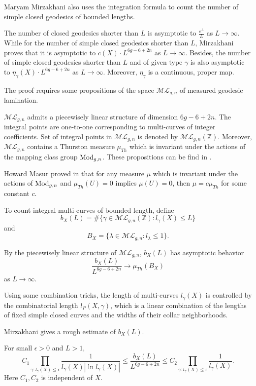 Maryam Mirzakhani also uses the integration formula to count the number of simple closed geodesics of bounded lengths. 

The number of closed geodesics shorter than $L$  is asymptotic to $\frac{e^L}{L}$ as $L\to \infty$. 
While for the number of  simple closed geodesics shorter than $L$,  Mirzakhani proves that it is asymptotic to $c(X)\cdot L^{6g-6+2n}$ as $L\to\infty$. Besides, the number of simple closed geodesics shorter than $L$ and of given  type $\gamma$ is also asymptotic to $\eta_{\gamma}(X)\cdot L^{6g-6+2n}$ as $L\to \infty$. Moreover, $\eta_{\gamma}$ is a continuous, proper map.


The proof requires some propositions of the space $\mathscr{ML}_{g,n}$ of measured geodesic lamination. 

$\mathscr{ML}_{g,n}$ admits a piecewisely linear structure of dimension $6g-6+2n$. The  integral points are one-to-one corresponding to multi-curves of integer coefficients.   Set of integral points in  $\mathscr{ML}_{g,n}$ is denoted by $\mathscr{ML}_{g,n}(\mathbb{Z})$. Moreover, $\mathscr{ML}_{g,n}$ contains a Thurston measure $\mu_{Th}$ which is invariant under the actions of the mapping class group $\operatorname{Mod}_{g,n}$. These propositions can be find in \cite{traintracks}.

Howard Masur proved in \cite{ergodic} that for any measure $\mu$ which is invariant under the actions of $\operatorname{Mod}_{g,n}$ and $\mu_{Th}(U)=0$ implies $\mu(U)=0$, then  $\mu=c\mu_{Th}$  for some constant $c$.

To count integral multi-curves of bounded length, define $$b_X(L)=\#\{\gamma\in \mathscr{ML}_{g,n}(\mathbb{Z}):l_\gamma(X)\leq L\}$$
 and $$B_X=\{\lambda\in \mathscr{ML}_{g,n}:l_{\lambda}\leq 1\}.$$
 
 By the piecewisely linear structure of $\mathscr{ML}_{g,n}$, $b_X(L)$ has asymptotic behavior 
 $$
 \frac{b_X(L)}{L^{6g-6+2n}}\to \mu_{Th}(B_X)
 $$
as $L\to \infty$.

Using some combination tricks, the length of multi-curves $l_\gamma(X)$ is controlled by the combinatorial length $l_{P}(X,\gamma)$, which is a linear   combination of the lengths of fixed simple closed curves and the widths of their collar neighborhoods.  

Mirzakhani gives a  rough estimate of $b_X(L)$.

\begin{thma}
For small $\epsilon>0$ and $L>1$, $$
C_1 \prod_{\gamma:l_{\gamma}(X)\leq \epsilon}\frac{1}{l_{\gamma}(X)|\ln l_{\gamma}(X) |}\leq  \frac{b_X(L)}{L^{6g-6+2n}}\leq C_2\prod_{\gamma:l_{\gamma}(X)\leq \epsilon}\frac{1}{l_{\gamma}(X)}.
$$
Here $C_1,C_2$ is independent of $X$.
\end{thma}

